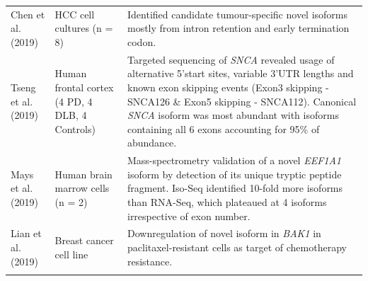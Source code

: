 \begin{landscape}
\begin{longtable}[c]{p{4cm}p{4cm}p{18cm}}
		\centering Chen et al. (2019) \cite{Chen2019} &
		\centering HCC cell cultures (n = 8)  &
		\tabitem Identified candidate tumour-specific novel isoforms mostly from intron retention and early termination codon.\\
		\hdashline[0.5pt/5pt]
		
		\centering Tseng et al. (2019) \cite{Tseng2019} &
		\centering Human frontal cortex \newline (4 PD, 4 DLB, 4 Controls)  &
		\tabitem Targeted sequencing of \textit{SNCA} revealed usage of alternative 5'start sites, variable 3'UTR lengths and known exon skipping events (Exon3 skipping - SNCA126 \& Exon5 skipping - SNCA112). \newline 
		\tabitem Canonical \textit{SNCA} isoform was most abundant with isoforms containing all 6 exons accounting for 95\% of abundance.\\
		\hdashline[0.5pt/5pt]
		
		\centering Mays et al. (2019)\cite{DeslattesMays2019} &
		\centering Human brain marrow cells (n = 2)  &
		\tabitem  Mass-spectrometry validation of a novel \textit{EEF1A1} isoform by detection of its unique tryptic peptide fragment. \newline 
		\tabitem Iso-Seq identified 10-fold more isoforms than RNA-Seq, which plateaued at 4 isoforms irrespective of exon number. \\
		\hdashline[0.5pt/5pt]
		
		\centering Lian et al. (2019) \cite{Lian2019} &
		\centering Breast cancer cell line &
		\tabitem Downregulation of novel isoform in \textit{BAK1} in paclitaxel-resistant cells as target of chemotherapy resistance. \\
		\hdashline[0.5pt/5pt]
		

\end{longtable}
\end{landscape}
